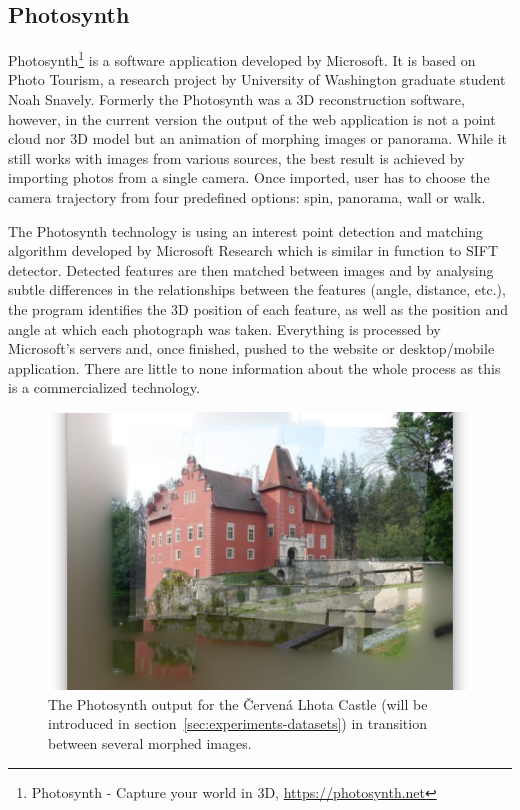 \subsection*{Photosynth}
Photosynth\footnote{Photosynth - Capture your world in 3D, \url{https://photosynth.net}} is a software application developed by Microsoft. It is based on Photo Tourism, a research project by University of Washington graduate student Noah Snavely. Formerly the Photosynth was a 3D reconstruction software, however, in the current version the output of the web application is not a point cloud nor 3D model but an animation of morphing images or panorama. While it still works with images from various sources, the best result is achieved by importing photos from a single camera. Once imported, user has to choose the camera trajectory from four predefined options: spin, panorama, wall or walk. 

The Photosynth technology is using an interest point detection and matching algorithm developed by Microsoft Research which is similar in function to SIFT detector. Detected features are then matched between images and by analysing subtle differences in the relationships between the features (angle, distance, etc.), the program identifies the 3D position of each feature, as well as the position and angle at which each photograph was taken. Everything is processed by Microsoft's servers and, once finished, pushed to the website or desktop/mobile application. There are little to none information about the whole process as this is a commercialized technology.

\begin{figure}[ht]
	\begin{center}
		\includegraphics[keepaspectratio,width=\textwidth]{fig/Photosynth.png}
	\end{center}
	\caption{The Photosynth output for the Červená Lhota Castle (will be introduced in section~\ref{sec:experiments-datasets}) in transition between several morphed images.}
	\label{fig:photosynth}
\end{figure}

